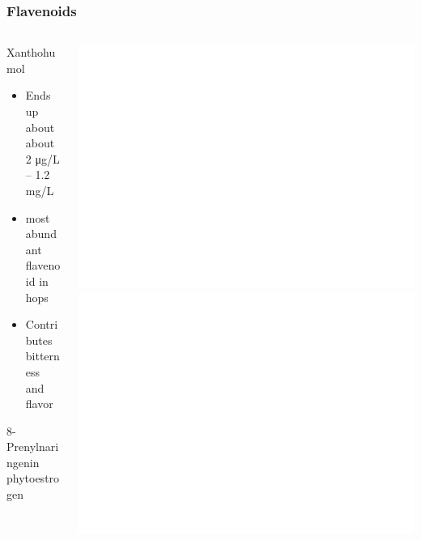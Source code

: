 \documentclass{beamer}
\begin{document}
\begin{frame}\frametitle{Flavenoids}
  \begin{columns}
    \begin{column}{.6\textwidth}
      Xanthohumol
      \begin{itemize}
      \item Ends up about about 2 μg/L – 1.2 mg/L
      \item most abundant flavenoid in hops
      \item Contributes bitterness and flavor
      \end{itemize}
      8-Prenylnaringenin phytoestrogen

    \end{column}
    \begin{column}{.4\textwidth}
      \includegraphics[width=.8\textwidth]{./brewing/hops/Xanthohumol.pdf}
      \vspace{5mm}
      \includegraphics[width=.8\textwidth]{./brewing/hops/Sophoraflavanone_B-dark.pdf}
    \end{column}
  \end{columns}
\end{frame}
\end{document}
